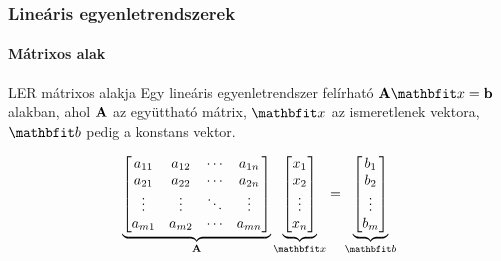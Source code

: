 \documentclass[xcolor={table}]{beamer}
\begin{document}
\begin{frame}
  \frametitle{Lineáris egyenletrendszerek}
  \framesubtitle{Mátrixos alak}

  \begin{block}{LER mátrixos alakja}
    Egy lineáris egyenletrendszer felírható $\rmat A \rvec x = \rmat b$
    alakban, ahol $\mathbf{A}$ az együttható mátrix, $\rvec x$ az ismeretlenek
    vektora, $\rvec b$ pedig a konstans vektor.

    \[
      \underbrace{\begin{bmatrix}
          a_{11} & a_{12} & \cdots & a_{1n} \\
          a_{21} & a_{22} & \cdots & a_{2n} \\
          \vdots & \vdots & \ddots & \vdots \\
          a_{m1} & a_{m2} & \cdots & a_{mn}
        \end{bmatrix}}_{\rmat A} \underbrace{\begin{bmatrix}
          x_{1} \\ x_{2} \\ \vdots \\ x_{n}
        \end{bmatrix}}_{\rvec x} = \underbrace{\begin{bmatrix}
          b_{1} \\ b_{2} \\ \vdots \\ b_{m}
        \end{bmatrix}}_{\rvec b}
    \]
  \end{block}
\end{frame}
\end{document}
